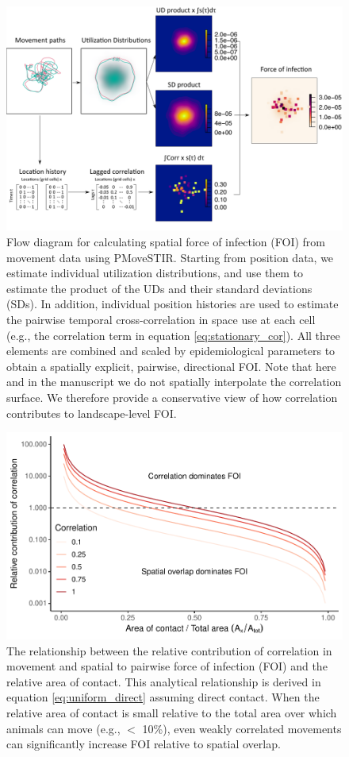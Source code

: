 \documentclass[letterpaper]{article}
\begin{document}
 \begin{figure}
     \includegraphics[width=\textwidth]{figures/steps_diagram.png}
     \caption{Flow diagram for calculating spatial force of infection (FOI) from movement data using PMoveSTIR. Starting from position data, we estimate individual utilization distributions, and use them to estimate the product of the UDs and their standard deviations (SDs). In addition, individual position histories are used to estimate the pairwise temporal cross-correlation in space use at each cell (e.g., the correlation term in equation \ref{eq:stationary_cor}). All three elements are combined and scaled by epidemiological parameters to obtain a spatially explicit, pairwise, directional FOI. Note that here and in the manuscript we do not spatially interpolate the correlation surface. We therefore provide a conservative view of how correlation contributes to landscape-level FOI.}
  \label{fig:steps}
 \end{figure}

\begin{figure}
    \includegraphics[width=\textwidth]{figures/correlation_analytical_figure.pdf}
    \caption{The relationship between the relative contribution of correlation in movement and spatial to pairwise force of infection (FOI) and the relative area of contact. This analytical relationship is derived in equation \ref{eq:uniform_direct} assuming direct contact.  When the relative area of contact is small relative to the total area over which animals can move (e.g., $<$ 10\%), even weakly correlated movements can significantly increase FOI relative to spatial overlap.}
    \label{fig:analytical_corr}
\end{figure}
\end{document}
